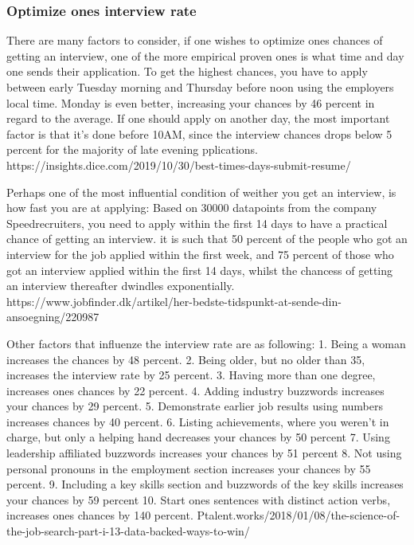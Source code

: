 \subsubsection{Optimize ones interview rate}
There are many factors to consider, if one wishes to optimize ones 
chances of getting an interview, one of the more empirical proven ones
is what time and day one sends their application. 
To get the highest chances, you have to apply between early Tuesday morning
and Thursday before noon using the employers local time. Monday is even better, 
increasing your chances by 46 percent in regard to the average. 
If one should apply on another day, the most important factor is that
it's done before 10AM, since the interview chances drops below 5 percent for 
the majority of late evening pplications.
https://insights.dice.com/2019/10/30/best-times-days-submit-resume/

Perhaps one of the most influential condition of weither you get an interview, 
is how fast you are at applying:
Based on 30000 datapoints from the company Speedrecruiters, you need
to apply within the first 14 days to have a practical chance of getting an
interview. it is such that 50 percent of the people who got an interview
for the job applied within the first week, and 75 percent of those who
got an interview applied within the first 14 days, whilst the chancess of 
getting an interview thereafter dwindles exponentially.
https://www.jobfinder.dk/artikel/her-bedste-tidspunkt-at-sende-din-ansoegning/220987

Other factors that influenze the interview rate are as following:
1. Being a woman increases the chances by 48 percent.
2. Being older, but no older than 35, increases the interview rate by 25 percent.
3. Having more than one degree, increases ones chances by 22 percent.
4. Adding industry buzzwords increases your chances by 29 percent.
5. Demonstrate earlier job results using numbers increases chances by 40 percent.
6. Listing achievements, where you weren't in charge, but only a helping hand
 decreases your chances by 50 percent
7. Using leadership affiliated buzzwords increases your chances by 51 percent
8. Not using personal pronouns in the employment section increases your
chances by 55 percent.
9. Including a key skills section and buzzwords of the key skills increases your
 chances by 59 percent
10. Start ones sentences with distinct action verbs, increases ones chances by 140 percent.
Ptalent.works/2018/01/08/the-science-of-the-job-search-part-i-13-data-backed-ways-to-win/





